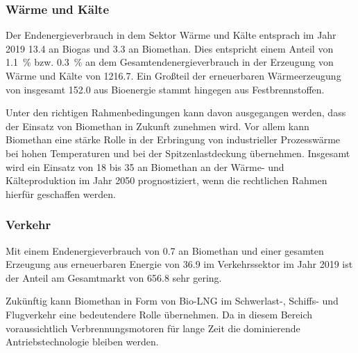 

\subsubsection{Wärme und Kälte}

Der Endenergieverbrauch in dem Sektor Wärme und Kälte entsprach im Jahr 2019 \SI{13.4}{\twh} an Biogas und \SI{3.3}{\twh} an Biomethan. Dies entspricht einem Anteil von \SI{1.1}{\percent} bzw. \SI{0.3}{\percent} an dem Gesamtendenergieverbrauch in der Erzeugung von Wärme und Kälte von \SI{1216.7}{\twh}. Ein Großteil der erneuerbaren Wärmeerzeugung von insgesamt \SI{152.0}{\twh} aus Bioenergie stammt hingegen aus Festbrennstoffen. \parencite{BWE2020}\smallskip

Unter den richtigen Rahmenbedingungen kann davon ausgegangen werden, dass der Einsatz von Biomethan in Zukunft zunehmen wird. Vor allem kann Biomethan eine stärke Rolle in der Erbringung von industrieller Prozesswärme bei hohen Temperaturen und bei der Spitzenlastdeckung übernehmen. Insgesamt wird ein Einsatz von \SI{18}{\twh} bis \SI{35}{\twh} an Biomethan an der Wärme- und Kälteproduktion im Jahr 2050 prognostiziert, wenn die rechtlichen Rahmen hierfür geschaffen werden. \parencite{dena2017}


\subsubsection{Verkehr}

Mit einem Endenergieverbrauch von \SI{0.7}{\twh} an Biomethan und einer gesamten Erzeugung aus erneuerbaren Energie von \SI{36.9}{\twh} im Verkehrssektor im Jahr 2019 ist der Anteil am Gesamtmarkt von \SI{656.8}{\twh} sehr gering. \parencite{BWE2020} \smallskip

Zukünftig kann Biomethan in Form von Bio-\gls{LNG} im Schwerlast-, Schiffs- und Flugverkehr eine bedeutendere Rolle übernehmen. Da in diesem Bereich voraussichtlich Verbrennungsmotoren für lange Zeit die dominierende Antriebstechnologie bleiben werden. \parencite{dena2017}